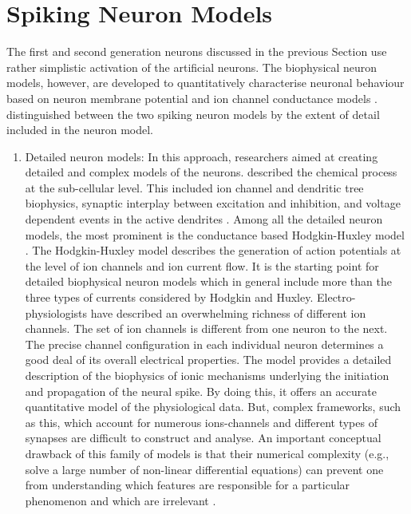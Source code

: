 \section{Spiking Neuron Models}

The first and second generation neurons discussed in the previous Section use rather simplistic activation of the artificial neurons. The biophysical neuron models, however, are developed to quantitatively characterise neuronal behaviour based on neuron membrane potential and ion channel conductance models \citep{ghosh2009spiking}. \citet{marian2002biologically} distinguished between the two spiking neuron models by the extent of detail included in the neuron model.

\begin{enumerate}

\item Detailed neuron models: In this approach, researchers aimed at creating detailed and complex models of the neurons. \citet{de1994active, segev1998compartmental} described the chemical process at the sub-cellular level. This included ion channel and dendritic tree biophysics, synaptic interplay between excitation and inhibition, and voltage dependent events in the active dendrites \citep{mainen1998modeling}. Among all the detailed neuron models, the most prominent is the conductance based Hodgkin-Huxley model \citep{hodgkin1952quantitative}. The Hodgkin-Huxley model describes the generation of action potentials at the level of ion channels and ion current flow. It is the starting point for detailed biophysical neuron models which in general include more than the three types of currents considered by Hodgkin and Huxley. Electro-physiologists have described an overwhelming richness of different ion channels. The set of ion channels is different from one neuron to the next. The precise channel configuration in each individual neuron determines a good deal of its overall electrical properties. The model provides a detailed description of the biophysics of ionic mechanisms underlying the initiation and propagation of the neural spike. By doing this, it offers an accurate quantitative model of the physiological data. But, complex frameworks, such as this, which account for numerous ions-channels and different types of synapses are difficult to construct and analyse. An important conceptual drawback of this family of models is that their numerical complexity (e.g., solve a large number of non-linear differential equations) can prevent one from understanding which features are responsible for a particular phenomenon and which are irrelevant \citep{koch1999neurobiology}.


\end{enumerate}
